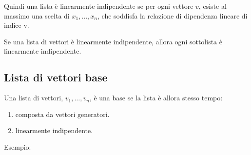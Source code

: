 \documentclass[a4paper,12pt]{article}
\begin{document}
	
	Quindi una lista è linearmente indipendente se per ogni vettore $v$, esiste al massimo una scelta di $x_1, \dots, x_n$, che soddisfa la relazione di dipendenza lineare di indice v.
	
	Se una lista di vettori è linearmente indipendente, allora ogni sottolista è linearmente indipendente.
	
	\subsection{Lista di vettori base}
	Una lista di vettori, $v_1, \dots, v_n$, è una base se la lista è allora stesso tempo:	
	\begin{enumerate}
		\renewcommand{\labelenumi}{\textit{(\roman{enumi})}}
		\item composta da vettori generatori.
		\item linearmente indipendente.
	\end{enumerate}
	Esempio:
\end{document}
